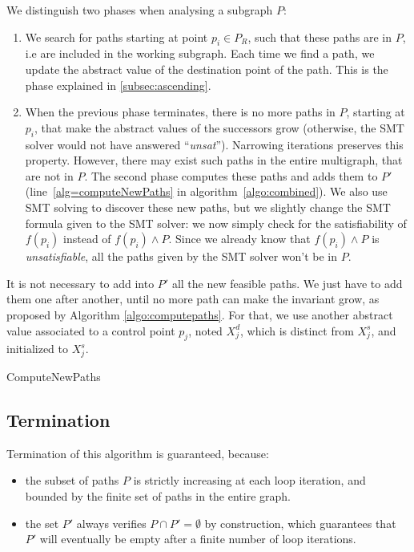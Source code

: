 \documentclass[preprint]{sigplanconf}
\begin{document}
We distinguish two phases when analysing a subgraph $P$:
\begin{enumerate}
\item We search for paths starting at point $p_i \in P_R$, such that these paths
	are in $P$, i.e are included in the working subgraph. Each time we find a
	path, we update the abstract value of the destination point of the path.
	This is the phase explained in \ref{subsec:ascending}.
\item  When the previous phase terminates, there is no more paths in
$P$, starting at $p_i$, 
that make the abstract values of the successors grow (otherwise, the SMT
solver would not have answered ``\emph{unsat}''). Narrowing iterations preserves
this property. 
However, there may exist such paths in the entire multigraph, that are not in
$P$. The second phase
computes these paths and adds them to $P'$ (line~\ref{alg=computeNewPaths} in
algorithm~\ref{algo:combined}). We also use SMT solving to discover
these new paths, but we slightly change the SMT formula given to the SMT solver:
we now simply check for the satisfiability of $f(p_i)$ instead of $f(p_i) \wedge
P$. Since we already know that $f(p_i) \wedge P$ is \emph{unsatisfiable}, all
the paths given by the SMT solver won't be in $P$.
\end{enumerate}

It is not necessary to add into $P'$ all the new feasible paths. We just have
to add them one after another, until no more path can make the invariant grow,
as proposed by Algorithm \ref{algo:computepaths}. For that, we use another
abstract value associated to a control point $p_j$, noted $X_j^d$, which is
distinct from $X_j^s$, and initialized to $X_j^s$.

\begin{algorithm}
	\caption{ComputeNewPaths}
	\label{algo:computepaths}
	\begin{algorithmic}[1] 
	
	\end{algorithmic}
\end{algorithm}

\subsection{Termination}
Termination of this algorithm is guaranteed, because:
\begin{itemize}
\item 
the subset of paths $P$ is
strictly increasing at each loop iteration, and bounded by the finite set of
paths in the entire graph. 
\item the set $P'$ always verifies $P \cap P' = \emptyset$ by construction, 
which guarantees that $P'$
will eventually be empty after a finite number of loop iterations.
\end{itemize}
\end{document}
